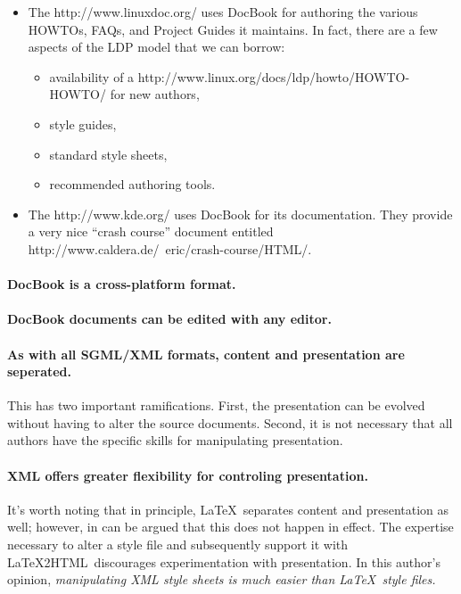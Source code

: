 \begin{itemize}
\item The %
{http://www.linuxdoc.org/} uses DocBook for authoring the various
HOWTOs, FAQs, and Project Guides it maintains.  In fact, there are a
few aspects of the LDP model that we can borrow:
\begin{itemize}
\item availability of a %
{http://www.linux.org/docs/ldp/howto/HOWTO-HOWTO/} for new authors,
\item style guides,
\item standard style sheets,
\item recommended authoring tools.
\end{itemize}
\item The %
{http://www.kde.org/} uses DocBook for its documentation.  They
provide a very nice ``crash course'' document entitled
%
{http://www.caldera.de/~eric/crash-course/HTML/}.
\end{itemize}

\paragraph{DocBook is a cross-platform format.}

\paragraph{DocBook documents can be edited with any editor.}

\paragraph{As with all SGML/XML formats, content and presentation are
seperated.}  This has two important ramifications.  First, the
presentation can be evolved without having to alter the source
documents.  Second, it is not necessary that all authors have the
specific skills for manipulating presentation.

\paragraph{XML offers greater flexibility for controling
presentation.}  It's worth noting that in principle, \LaTeX\ separates
content and presentation as well; however, in can be argued that this
does not happen in effect.  The expertise necessary to alter a style
file and subsequently support it with \LaTeX2HTML\ discourages
experimentation with presentation.  In this author's opinion, {\it
manipulating XML style sheets is much easier than \LaTeX\ style
files.}  

